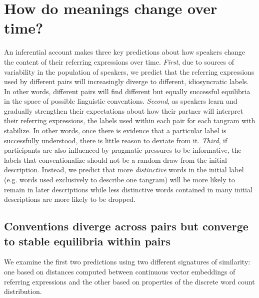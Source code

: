\documentclass[alpha-refs]{wiley-article}
\begin{document}

\section{How do meanings change over time?}

An inferential account makes three key predictions about how speakers change the content of their referring expressions over time.
\emph{First}, due to sources of variability in the population of speakers, we predict that the referring expressions used by different pairs will increasingly diverge to different, idiosyncratic labels.
In other words, different pairs will find different but equally successful equilibria in the space of possible linguistic conventions.
\emph{Second}, as speakers learn and gradually strengthen their expectations about how their partner will interpret their referring expressions, the labels used within each pair for each tangram with stabilize.
In other words, once there is evidence that a particular label is successfully understood, there is little reason to deviate from it.
\emph{Third}, if participants are also influenced by pragmatic pressures to be informative, the labels that conventionalize should not be a random draw from the initial description. 
Instead, we predict that more \emph{distinctive} words in the initial label (e.g. words used exclusively to describe one tangram) will be more likely to remain in later descriptions while less distinctive words contained in many initial descriptions are more likely to be dropped.

\subsection{Conventions diverge across pairs but converge to stable equilibria within pairs}

We examine the first two predictions using two different signatures of similarity: one based on distances computed between continuous vector embeddings of referring expressions and the other based on properties of the discrete word count distribution.
\end{document}

